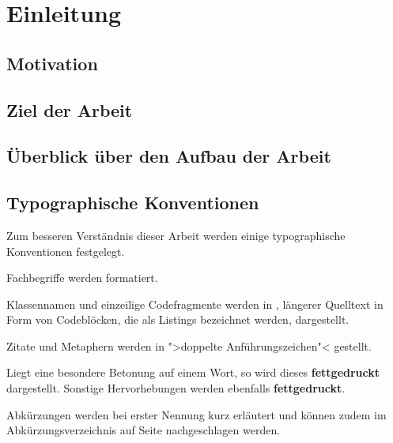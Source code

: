 \chapter{Einleitung}
\label{cha:Einleitung}

\section{Motivation}
\label{sec:Einl:Motivation}


\section{Ziel der Arbeit}
\label{sec:Einl:Ziel_der_Arbeit}



\section{Überblick über den Aufbau der Arbeit}
\label{sec:Einleitung:Aufbau_der_Arbeit}



\section{Typographische Konventionen}
\label{sec:Typographische_Konventionen}

Zum besseren Verständnis dieser Arbeit werden einige typographische Konventionen festgelegt.

Fachbegriffe werden  formatiert.

Klassennamen und einzeilige Codefragmente werden in , längerer Quelltext in Form von Codeblöcken, die als Listings bezeichnet werden, dargestellt.

Zitate und Metaphern werden in ">doppelte Anführungszeichen"< gestellt.

Liegt eine besondere Betonung auf einem Wort, so wird dieses \textbf{fettgedruckt} dargestellt.
Sonstige Hervorhebungen werden ebenfalls \textbf{fettgedruckt}.

Abkürzungen werden bei erster Nennung kurz erläutert und können zudem im Abkürzungsverzeichnis auf Seite \pageref{sec:Glossar} nachgeschlagen werden.